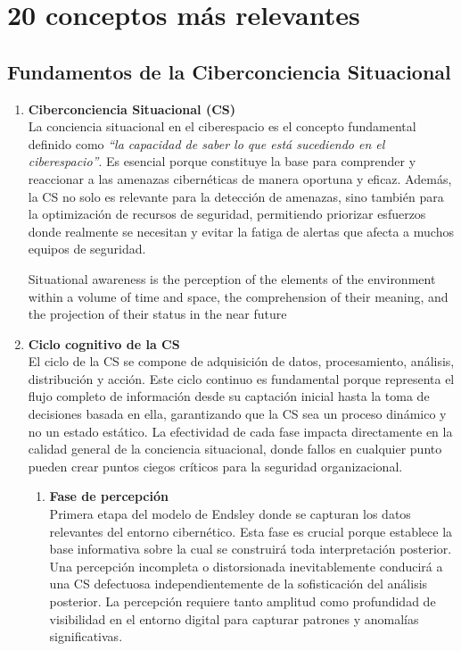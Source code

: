 \chapter{20 conceptos más relevantes}

\section{Fundamentos de la Ciberconciencia Situacional}
\begin{enumerate}
\item \textbf{Ciberconciencia Situacional (CS)} \\
La conciencia situacional en el ciberespacio es el concepto fundamental definido como \textit{``la capacidad de saber lo que está sucediendo en el ciberespacio''}. Es esencial porque constituye la base para comprender y reaccionar a las amenazas cibernéticas de manera oportuna y eficaz.
Además, la CS no solo es relevante para la detección de amenazas, sino también para la optimización de recursos de seguridad, permitiendo priorizar esfuerzos donde realmente se necesitan y evitar la fatiga de alertas que afecta a muchos equipos de seguridad.

\begin{definition}
   Situational awareness is the perception of the elements of the environment within
   a volume of time and space, the comprehension of their meaning, and the
   projection of their status in the near future
\end{definition}

\item \textbf{Ciclo cognitivo de la CS} \\
El ciclo de la CS se compone de adquisición de datos, procesamiento, análisis, distribución y acción. Este ciclo continuo es fundamental porque representa el flujo completo de información desde su captación inicial hasta la toma de decisiones basada en ella, garantizando que la CS sea un proceso dinámico y no un estado estático. La efectividad de cada fase impacta directamente en la calidad general de la conciencia situacional, donde fallos en cualquier punto pueden crear puntos ciegos críticos para la seguridad organizacional.
\begin{enumerate}
   \item \textbf{Fase de percepción} \\
   Primera etapa del modelo de Endsley donde se capturan los datos relevantes del entorno cibernético. Esta fase es crucial porque establece la base informativa sobre la cual se construirá toda interpretación posterior. Una percepción incompleta o distorsionada inevitablemente conducirá a una CS defectuosa independientemente de la sofisticación del análisis posterior. La percepción requiere tanto amplitud como profundidad de visibilidad en el entorno digital para capturar patrones y anomalías significativas.
   

\end{enumerate}
\end{enumerate}
